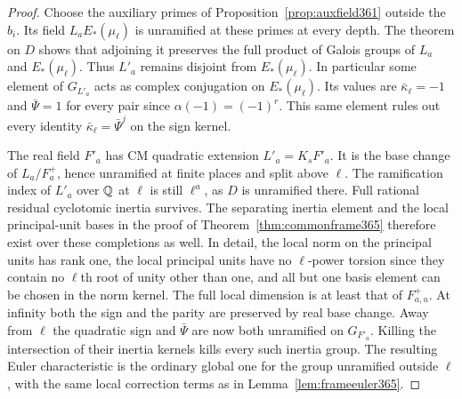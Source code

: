 \documentclass[a4paper,11pt]{article}
\theoremstyle{definition}
\theoremstyle{remark}
\numberwithin{equation}{section}
\begin{document}
\begin{proof}
Choose the auxiliary primes of Proposition~\ref{prop:auxfield361}
outside the \(b_i\). Its field \(L_aE_*(\mu_\ell)\) is unramified
at these primes at every depth. The theorem on \(D\) shows that
adjoining it preserves the full product of Galois groups of
\(L_a\) and \(E_*(\mu_\ell)\). Thus \(L'_a\) remains disjoint
from \(E_*(\mu_\ell)\). In particular some element of \(G_{L'_a}\)
acts as complex conjugation on \(E_*(\mu_\ell)\). Its values are
\(\bar\kappa_\ell=-1\) and \(\bar\Psi=1\) for every pair since
\(\alpha(-1)=(-1)^r\). This same element rules out every
identity \(\bar\kappa_\ell=\bar\Psi^j\) on the sign kernel.

The real field \(F'_a\) has CM quadratic extension
\(L'_a=K_sF'_a\). It is the base change of \(L_a/F_a^+\),
hence unramified at finite places and split above \(\ell\).
The ramification index of \(L'_a\) over \(\mathbb Q\) at \(\ell\)
is still \(\ell^a\), as \(D\) is unramified there. Full rational
residual cyclotomic inertia survives. The separating inertia
element and the local principal-unit bases in the proof of
Theorem~\ref{thm:commonframe365} therefore exist over these
completions as well. In detail, the local norm on the principal
units has rank one, the local principal units have no
\(\ell\)-power torsion since they contain no \(\ell\)th root
of unity other than one, and all but one basis element can be
chosen in the norm kernel. The full local dimension is at least
that of \(F_{a,u}^+\). At infinity both the sign and the parity
are preserved by real base change. Away from \(\ell\) the
quadratic sign and \(\bar\Psi\) are now both unramified on
\(G_{F'_a}\). Killing the intersection of their inertia kernels
kills every such inertia group. The resulting Euler characteristic
is the ordinary global one for the group unramified outside
\(\ell\), with the same local correction terms as in
Lemma~\ref{lem:frameeuler365}.


\end{proof}
\end{document}
